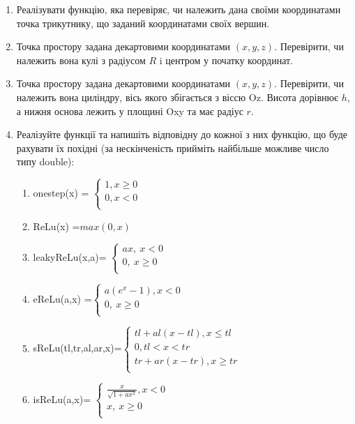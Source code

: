 \documentclass[a5paper,titlepage,openany,twoside,
]
{book_unv}%
\makeatletter
\newcommand{\xslalph}[1]{\expandafter\@xslalph\csname c@#1\endcsname}
\newcommand{\@xslalph}[1]{%
    \ifcase#1\or а\or б\or в\or г\or д\or e\or є\or ж\or з\or i%
    \or й\or к\or л\or м\or н\or о\or п\or р\or с\or т%
    \or у\or ф\or х\or ц\or ч\or ш\or ю\or я\or аа\or бб\or вв%
    \else\@ctrerr\fi%
}
\makeatother
\begin{document}
\begin{enumerate}
\item
  Реалізувати функцію, яка перевіряє, чи належить дана своїми координатами
 точка трикутнику, що заданий координатами своїх вершин.
\item
  Точка простору задана декартовими координатами $(x, y, z)$. Перевірити,
  чи належить вона кулі з радіусом $R$ i центром у початку координат.
\item
  Точка простору задана декартовими координатами $(x, y, z)$. Перевірити,
  чи належить вона циліндру, вісь якого збігається з віссю Oz. Висота
  дорівнює $h$, а нижня основа лежить у площині Oxy та має радіус $r$.
\item
  Реалізуйте функції та напишіть відповідну до кожної з них функцію, що
  буде рахувати їх похідні (за нескінченість прийміть найбільше можливе 
число типу double):
\begin{enumerate}[label=\xslalph*)]
\item onestep(x) = \(\left\{ \begin{matrix}
1,x \geq 0 \\
0,x < 0 \\
\end{matrix} \right.\ \)

\item 
ReLu(x) =\(max(0,x)\)

\item
leakyReLu(x,a)= \(\left\{ \begin{matrix}
ax,\ x < 0 \\
0,\ x \geq 0 \\
\end{matrix} \right.\ \)

\item 
eReLu(a,x) =\(\left\{ \begin{matrix}
a(e^{x} - 1),x < 0 \\
0,\ x \geq 0 \\
\end{matrix} \right.\ \)

\item 
sReLu(tl,tr,al,ar,x)=\(\left\{ \begin{matrix}
tl + al\left( x - tl \right),x \leq tl \\
0,tl < x < tr \\
tr + ar\left( x - tr \right),x \geq tr \\
\end{matrix} \right.\ \)

\item
 isReLu(a,x)= \(\left\{ \begin{matrix}
\frac{x}{\sqrt{1 + ax^{2}}},x < 0 \\
x,\ x \geq 0 \\
\end{matrix} \right.\ \)


\end{enumerate}
\end{enumerate}
\end{document}
